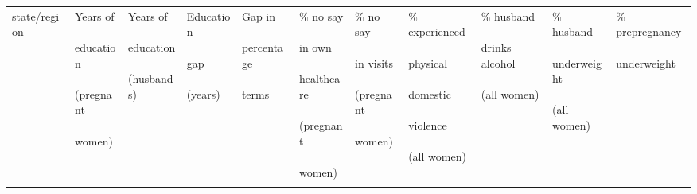 \begin{tabular}{l*{10}{>{\centering\arraybackslash}p{1.55cm}}}
\toprule
state/region &          \shortstack{Years of \\\\ education \\\\ (pregnant \\\\ women)} &          \shortstack{Years of \\\\ education \\\\ (husbands)} &          \shortstack{Education \\\\ gap \\\\ (years)} &          \shortstack{Gap in \\\\ percentage \\\\ terms} &          \shortstack{\% no say \\\\ in own \\\\ healthcare  \\\\ (pregnant \\\\ women)} &          \shortstack{\% no say \\\\ in visits \\\\ (pregnant \\\\ women)} &          \shortstack{\% experienced \\\\ physical \\\\ domestic \\\\ violence \\\\ (all women)} &          \shortstack{\% husband \\\\ drinks alcohol \\\\ (all women)} &          \shortstack{\% husband \\\\ underweight \\\\ (all women)} &          \shortstack{\% prepregnancy \\\\ underweight} \\\\

\end{tabular}
